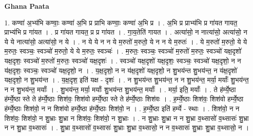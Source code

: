 \documentclass[17pt]{extarticle}
\begin{document}
\textbf{Ghana Paata } \newline

1. कण्वा॑ अ॒भ्य॑भि कण्वाः॒ कण्वा॑ अ॒भि प्र प्राभि कण्वाः॒ कण्वा॑ अ॒भि प्र । . अ॒भि प्र प्राभ्य॑भि प्र गा॑यत गायत॒ प्राभ्य॑भि प्र गा॑यत । . प्र गा॑यत गायत॒ प्र प्र गा॑यत । . गा॒य॒तेति॑ गायत । . अत्या॑सो॒ न नात्या॑सो॒ अत्या॑सो॒ न ये ये नात्या॑सो॒ अत्या॑सो॒ न ये । . न ये ये न न ये म॒रुतो॑ म॒रुतो॒ ये न न ये म॒रुतः॑ । . ये म॒रुतो॑ म॒रुतो॒ ये ये म॒रुतः॒ स्वञ्चः॒ स्वञ्चो॑ म॒रुतो॒ ये ये म॒रुतः॒ स्वञ्चः॑ । . म॒रुतः॒ स्वञ्चः॒ स्वञ्चो॑ म॒रुतो॑ म॒रुतः॒ स्वञ्चो॑ यक्ष॒दृशो॑ यक्ष॒दृशः॒ स्वञ्चो॑ म॒रुतो॑ म॒रुतः॒ स्वञ्चो॑ यक्ष॒दृशः॑ । . स्वञ्चो॑ यक्ष॒दृशो॑ यक्ष॒दृशः॒ स्वञ्चः॒ स्वञ्चो॑ यक्ष॒दृशो॒ न न य॑क्ष॒दृशः॒ स्वञ्चः॒ स्वञ्चो॑ यक्ष॒दृशो॒ न । . य॒क्ष॒दृशो॒ न न य॑क्ष॒दृशो॑ यक्ष॒दृशो॒ न शु॒भय॑न्त शु॒भय॑न्त॒ न य॑क्ष॒दृशो॑ यक्ष॒दृशो॒ न शु॒भय॑न्त । . य॒क्ष॒दृश॒ इति॑ यक्ष - दृशः॑ । . न शु॒भय॑न्त शु॒भय॑न्त॒ न न शु॒भय॑न्त॒ मर्या॒ मर्याः᳚ शु॒भय॑न्त॒ न न शु॒भय॑न्त॒ मर्याः᳚ । . शु॒भय॑न्त॒ मर्या॒ मर्याः᳚ शु॒भय॑न्त शु॒भय॑न्त॒ मर्याः᳚ । . मर्या॒ इति॒ मर्याः᳚ । . ते ह॑र्म्ये॒ष्ठा ह॑र्म्ये॒ष्ठा स्ते ते ह॑र्म्ये॒ष्ठाः शिश॑वः॒ शिश॑वो हर्म्ये॒ष्ठा स्ते ते ह॑र्म्ये॒ष्ठाः शिश॑वः । . ह॒र्म्ये॒ष्ठाः शिश॑वः॒ शिश॑वो हर्म्ये॒ष्ठा ह॑र्म्ये॒ष्ठाः शिश॑वो॒ न न शिश॑वो हर्म्ये॒ष्ठा ह॑र्म्ये॒ष्ठाः शिश॑वो॒ न । . ह॒र्म्ये॒ष्ठा इति॑ हर्म्ये - स्थाः । . शिश॑वो॒ न न शिश॑वः॒ शिश॑वो॒ न शु॒भ्राः शु॒भ्रा न शिश॑वः॒ शिश॑वो॒ न शु॒भ्राः । . न शु॒भ्राः शु॒भ्रा न न शु॒भ्रा व॒थ्सासो॑ व॒थ्सासः॑ शु॒भ्रा न न शु॒भ्रा व॒थ्सासः॑ । . शु॒भ्रा व॒थ्सासो॑ व॒थ्सासः॑ शु॒भ्राः शु॒भ्रा व॒थ्सासो॒ न न व॒थ्सासः॑ शु॒भ्राः शु॒भ्रा व॒थ्सासो॒ न । \newline
\end{document}
